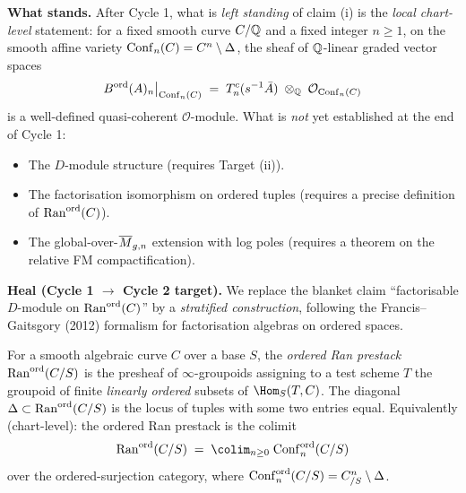 \textbf{What stands.} After Cycle 1, what is \emph{left standing} of
claim (i) is the \emph{local chart-level} statement: for a fixed smooth
curve $C/\mathbb{Q}$ and a fixed integer $n \ge 1$, on the smooth affine variety
$\mathrm{Conf}_n(C) = C^n \setminus \Delta$, the sheaf of $\mathbb{Q}$-linear graded
vector spaces
\[
B^{\mathrm{ord}}(A)_n \big|_{\mathrm{Conf}_n(C)} \;=\; T^c_n(s^{-1} \bar A)
\;\otimes_{\mathbb{Q}}\; \mathcal{O}_{\mathrm{Conf}_n(C)}
\]
is a well-defined quasi-coherent $\mathcal{O}$-module. What is
\emph{not} yet established at the end of Cycle 1:
\begin{itemize}
\item The $D$-module structure (requires Target (ii)).
\item The factorisation isomorphism on ordered tuples (requires a
precise definition of $\mathrm{Ran}^{\mathrm{ord}}(C)$).
\item The global-over-$\overline{M}_{g,n}$ extension with log poles
(requires a theorem on the relative FM compactification).
\end{itemize}

\textbf{Heal (Cycle 1 $\to$ Cycle 2 target).} We replace the blanket
claim ``factorisable $D$-module on $\mathrm{Ran}^{\mathrm{ord}}(C)$'' by a
\emph{stratified construction}, following the Francis--Gaitsgory (2012)
formalism for factorisation algebras on ordered spaces.

\begin{definition}
\label{wn:def:opus-ran-ord}
For a smooth algebraic curve $C$ over a base $S$, the \emph{ordered Ran
prestack} $\mathrm{Ran}^{\mathrm{ord}}(C/S)$ is the presheaf of $\infty$-groupoids
assigning to a test scheme $T$ the groupoid of finite \emph{linearly
ordered} subsets of $\Hom_S(T, C)$. The diagonal
$\Delta \subset \mathrm{Ran}^{\mathrm{ord}}(C/S)$ is the locus of tuples with
some two entries equal. Equivalently (chart-level): the ordered Ran
prestack is the colimit
\[
\Ran^{\mathrm{ord}}(C/S) \;=\; \colim_{n \ge 0}\;
\Conf_n^{\mathrm{ord}}(C/S)
\]
over the ordered-surjection category, where
$\mathrm{Conf}_n^{\mathrm{ord}}(C/S) = C^n_{/S} \setminus \Delta$.
\end{definition}

